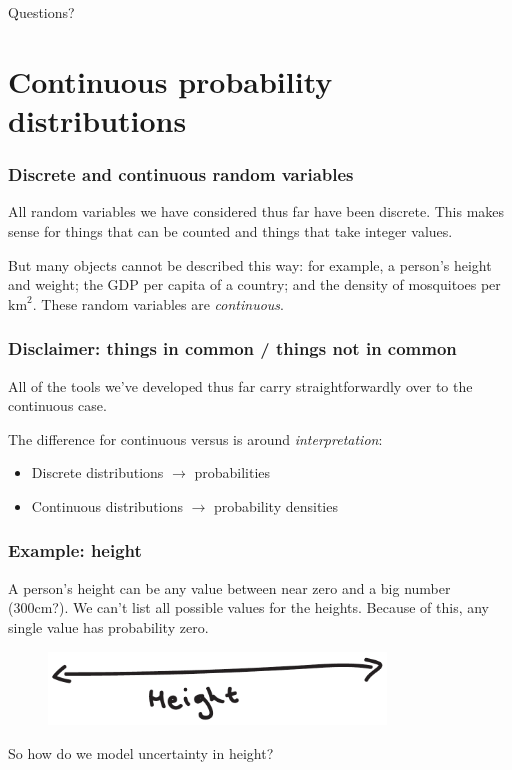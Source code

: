 \documentclass{beamer}
\begin{document}
	\begin{frame}
		\Large Questions?
	\end{frame}
	
	\section{Continuous probability distributions}
	\frame{\tableofcontents[currentsection]}
	
	\begin{frame}
		\frametitle{Discrete and continuous random variables}
		
		All random variables we have considered thus far have been discrete. This makes sense for things that can be counted and things that take integer values.
		
		\vspace{0.5cm}
		
		But many objects cannot be described this way: for example, a person's height and weight; the GDP per capita of a country; and the density of mosquitoes per $\text{km}^2$. These random variables are \textit{continuous}.
		
	\end{frame}
	
	\begin{frame}
		\frametitle{Disclaimer: things in common / things not in common}
		
		All of the tools we've developed thus far carry straightforwardly over to the continuous case.
		
		\vspace{0.5cm}
		
		The difference for continuous versus is around \textit{interpretation}:
		
		\begin{itemize}
			\item Discrete distributions $\rightarrow$ probabilities
			\item Continuous distributions $\rightarrow$ probability densities
		\end{itemize}
		
	\end{frame}
	
	\begin{frame}
		\frametitle{Example: height}
		
		A person's height can be any value between near zero and a big number (300cm?). We can't list all possible values for the heights. Because of this, any single value has probability zero.
		
		\begin{figure}[ht]
			\centerline{\includegraphics[width=0.8\textwidth]{./figures/height_base.pdf}}
		\end{figure}
		
		So how do we model uncertainty in height?
		
	\end{frame}
	
\end{document}
